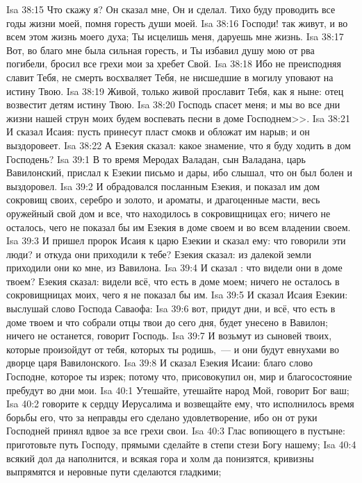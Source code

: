 \vs Isa 38:15 Что скажу я? Он сказал мне, Он и сделал. Тихо буду проводить все годы жизни моей, помня горесть души моей.
\vs Isa 38:16 Господи! так живут, и во всем этом жизнь моего духа; Ты исцелишь меня, даруешь мне жизнь.
\vs Isa 38:17 Вот, во благо мне была сильная горесть, и Ты избавил душу мою от рва погибели, бросил все грехи мои за хребет Свой.
\vs Isa 38:18 Ибо не преисподняя славит Тебя, не смерть восхваляет Тебя, не нисшедшие в могилу уповают на истину Твою.
\vs Isa 38:19 Живой, только живой прославит Тебя, как я ныне: отец возвестит детям истину Твою.
\vs Isa 38:20 Господь спасет меня; и мы во все дни жизни нашей  струн моих будем воспевать песни в доме Господнем>>.
\vs Isa 38:21 И сказал Исаия: пусть принесут пласт смокв и обложат им нарыв; и он выздоровеет.
\vs Isa 38:22 А Езекия сказал: какое знамение, что я буду ходить в дом Господень?
\vs Isa 39:1 В то время Меродах Валадан, сын Валадана, царь Вавилонский, прислал к Езекии письмо и дары, ибо слышал, что он был болен и выздоровел.
\vs Isa 39:2 И обрадовался посланным Езекия, и показал им дом сокровищ своих, серебро и золото, и ароматы, и драгоценные масти, весь оружейный свой дом и все, что находилось в сокровищницах его; ничего не осталось, чего не показал бы им Езекия в доме своем и во всем владении своем.
\rsbpar\vs Isa 39:3 И пришел пророк Исаия к царю Езекии и сказал ему: что говорили эти люди? и откуда они приходили к тебе? Езекия сказал: из далекой земли приходили они ко мне, из Вавилона.
\vs Isa 39:4 И сказал : что видели они в доме твоем? Езекия сказал: видели всё, что есть в доме моем; ничего не осталось в сокровищницах моих, чего я не показал бы им.
\vs Isa 39:5 И сказал Исаия Езекии: выслушай слово Господа Саваофа:
\vs Isa 39:6 вот, придут дни, и всё, что есть в доме твоем и что собрали отцы твои до сего дня, будет унесено в Вавилон; ничего не останется, говорит Господь.
\vs Isa 39:7 И возьмут из сыновей твоих, которые произойдут от тебя, которых ты родишь,~--- и они будут евнухами во дворце царя Вавилонского.
\vs Isa 39:8 И сказал Езекия Исаии: благо слово Господне, которое ты изрек; потому что, присовокупил он, мир и благосостояние пребудут во дни мои.
\vs Isa 40:1 Утешайте, утешайте народ Мой, говорит Бог ваш;
\vs Isa 40:2 говорите к сердцу Иерусалима и возвещайте ему, что исполнилось время борьбы его, что за неправды его сделано удовлетворение, ибо он от руки Господней принял вдвое за все грехи свои.
\rsbpar\vs Isa 40:3 Глас вопиющего в пустыне: приготовьте путь Господу, прямыми сделайте в степи стези Богу нашему;
\vs Isa 40:4 всякий дол да наполнится, и всякая гора и холм да понизятся, кривизны выпрямятся и неровные пути сделаются гладкими;
